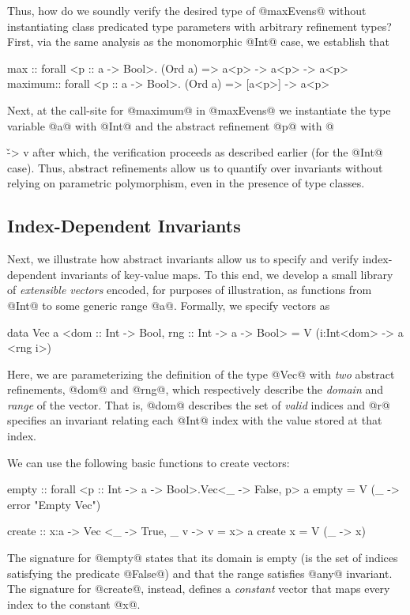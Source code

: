{{{%

Thus, how do we soundly verify the desired type of @maxEvens@ 
without instantiating class predicated type parameters with 
arbitrary refinement types? First, via the same analysis as 
the monomorphic @Int@ case, we establish that
%
\begin{code}
  max    :: forall <p :: a -> Bool>. (Ord a) => a<p> -> a<p> -> a<p>
  maximum:: forall <p :: a -> Bool>. (Ord a) => [a<p>] -> a<p>
\end{code}
%
Next, at the call-site for @maximum@ in @maxEvens@ we
instantiate the type variable @a@ with @Int@ and 
the abstract refinement @p@ with @{\v -> v %
after which, the verification proceeds as described
earlier (for the @Int@ case).
Thus, abstract refinements allow us to quantify over 
invariants without relying on parametric polymorphism, 
even in the presence of type classes.

\subsection{Index-Dependent Invariants}\label{sec:overview:index}

Next, we illustrate how abstract invariants allow us to 
specify and verify index-dependent invariants of key-value maps. 
To this end, we develop a small library of \emph{extensible vectors} 
encoded, for purposes of illustration, as functions from @Int@ to 
some generic range @a@. Formally, we specify vectors as 
%
\begin{code}
  data Vec a <dom :: Int -> Bool, rng :: Int -> a -> Bool> 
    = V (i:Int<dom> -> a <rng i>)
\end{code}
%
Here, we are parameterizing the definition of the type @Vec@ 
with \emph{two} abstract refinements, @dom@ and @rng@, which
respectively describe the \emph{domain} and \emph{range} of the vector.
That is, @dom@ describes the set of \emph{valid} indices
and @r@ specifies an invariant relating each @Int@ index
with the value stored at that index.

We can use the following basic functions to create vectors:
%
\begin{code}
  empty :: forall <p :: Int -> a -> Bool>.Vec<{\_ -> False}, p> a
  empty = V (\_ -> error "Empty Vec")

  create :: x:a -> Vec <{\_ -> True}, {\_ v -> v = x}> a
  create x = V (\_ -> x)
\end{code}
%
The signature for @empty@ states that its domain is empty (\ie is
the set of indices satisfying the predicate @False@) and that the
range satisfies @any@ invariant. The signature for @create@,
instead, defines a \emph{constant} vector that maps every index to the
constant @x@.

}}}}
